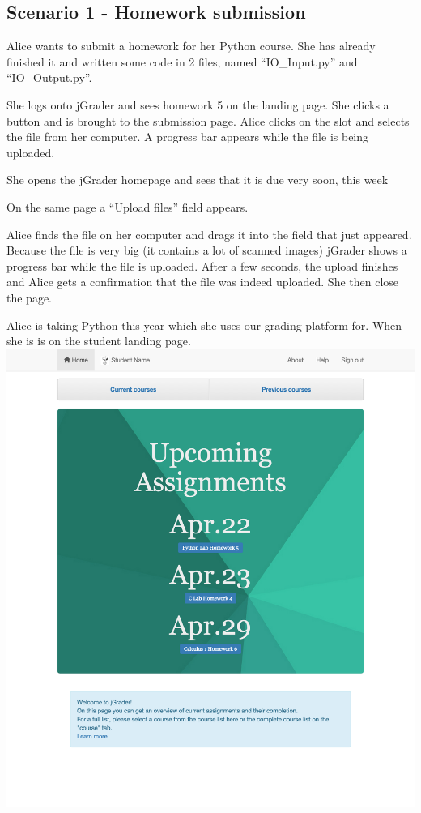 \subsection{Scenario 1 - Homework submission}

Alice wants to submit a homework for her Python course. She has already finished it and written some code in 2 files, named ``IO\_Input.py'' and ``IO\_Output.py''.

She logs onto jGrader and sees homework 5 on the landing page. She clicks a button and is brought to the submission page. Alice clicks on the slot and selects the file from her computer. A progress bar appears while the file is being uploaded.

She opens the jGrader homepage and sees that it is due very soon, this week

On the same page a ``Upload files'' field appears.

Alice finds the file on her computer and drags it into the field that just appeared. Because the file is very big (it contains a lot of scanned images) jGrader shows a progress bar while the file is uploaded. After a few seconds, the upload finishes and Alice gets a confirmation that the file was indeed uploaded. She then close the page.


Alice is taking Python this year which she uses our grading platform for. When she is is on the student landing page.\\
\includegraphics[width=\textwidth]{screenshots/StudentLandingPage.png}\\

